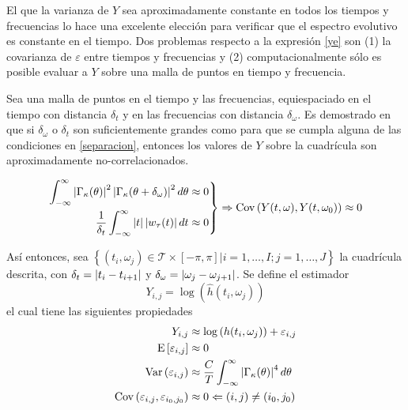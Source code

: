 El que la varianza de $Y$ sea aproximadamente constante en todos los tiempos y frecuencias lo hace 
una excelente elección para verificar que el espectro evolutivo es constante en el tiempo.
%
Dos problemas respecto a la expresión \ref{ye} son (1) la covarianza de $\varepsilon$ entre
tiempos y frecuencias y (2) computacionalmente sólo es posible evaluar a $Y$ sobre una malla
de puntos en tiempo y frecuencia.

Sea una malla de puntos en el tiempo y las frecuencias, equiespaciado en el tiempo con distancia 
$\delta_t$ y en las frecuencias con distancia $\delta_\omega$.
Es demostrado en \cite{Priestley66} que si $\delta_\omega$ o $\delta_t$ son suficientemente grandes
como para que se cumpla alguna de las condiciones en \ref{separacion}, entonces los valores de $Y$
sobre la cuadrícula son aproximadamente no-correlacionados.

\begin{equation}
\left.
\begin{aligned}
\int_{-\infty}^{\infty} \left| \Gamma_\kappa(\theta) \right|^{2}\left| \Gamma_\kappa(\theta+\delta_\omega) \right|^{2} d\theta 
&\approx 0 \\
\frac{1}{\delta_t} \int_{-\infty}^{\infty} \left| t \right| \left| w_\tau (t) \right| dt &\approx 0
\end{aligned}
\right\rbrace
\Rightarrow
\mathrm{Cov}\left( Y(t,\omega),Y(t,\omega_0) \right) \approx 0
\label{separacion}
\end{equation}

Así entonces, sea
$\left\{ (t_i,\omega_j) \in \mathcal{T} \times [-\pi,\pi] | i = 1,\dots,I ; j=1,\dots,J \right\}$
la cuadrícula descrita, con $\delta_t= \left| t_i - t_{i+1} \right|$ y 
$\delta_\omega = \left| \omega_j-\omega_{j+1} \right|$. 
%
Se define el estimador
\begin{equation}
Y_{i,j} = \log\left(\widehat{h}(t_i,\omega_j)\right)
\end{equation}
%
el cual tiene las siguientes propiedades
%
\begin{align*}
Y_{i,j} &\approx \log\left(h(t_i,\omega_j)\right) + \varepsilon_{i,j} \\
\mathrm{E}\left[ \varepsilon_{i,j} \right] &\approx 0 \\
\mathrm{Var}\left( \varepsilon_{i,j} \right) &\approx
\frac{C}{T} \int_{-\infty}^{\infty} \left| \Gamma_\kappa(\theta) \right|^{4} d\theta \\
\mathrm{Cov}\left( \varepsilon_{i,j},\varepsilon_{i_0,j_0} \right) &\approx 0 
\Leftarrow (i,j)\neq (i_0,j_0)
\end{align*}


